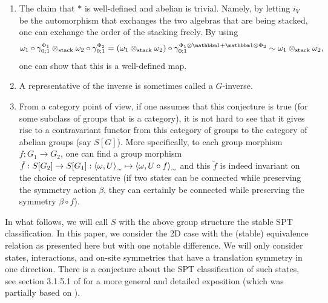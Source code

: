 \documentclass[11pt,a4paper,twoside]{article}
\numberwithin{equation}{section}
\begin{document}
	\begin{enumerate}
		\item The claim that $*$ is well-defined and abelian is trivial. Namely, by letting $i_V$ be the automorphism that exchanges the two algebras that are being stacked, one can exchange the order of the stacking freely. By using
		\begin{equation}
			\omega_1\circ\gamma^{\Phi_1}_{0;1}\otimes_\text{stack}\omega_2\circ\gamma^{\Phi_2}_{0;1}=(\omega_1\otimes_{\text{stack}}\omega_2)\circ\gamma^{\Phi_1\otimes\id+\id\otimes\Phi_2}_{0;1}\sim\omega_1\otimes_{\text{stack}}\omega_2,
		\end{equation}
		one can show that this is a well-defined map.
		\item A representative of the inverse is sometimes called a $G$-inverse.
		\item From a category point of view, if one assumes that this conjecture is true (for some subclass of groups that is a category), it is not hard to see that it gives rise to a contravariant functor from this category of groups to the category of abelian groups (say $S[G]$). More specifically, to each group morphism $f:G_1\rightarrow G_2$, one can find a group morphism $\tilde{f}:S[G_2]\rightarrow S[G_1]:\expval{\omega,U}_\sim\mapsto \expval{\omega,U\circ f}_\sim$ and this $\tilde{f}$ is indeed invariant on the choice of representative (if two states can be connected while preserving the symmetry action $\beta$, they can certainly be connected while preserving the symmetry $\beta\circ f$).
	\end{enumerate}
	In what follows, we will call $S$ with the above group structure the stable SPT classification. In this paper, we consider the 2D case with the (stable) equivalence relation as presented here but with one notable difference. We will only consider states, interactions, and on-site symmetries that have a translation symmetry in one direction. There is a conjecture about the SPT classification of such states, see section 3.1.5.1 of \cite{xiong2019classification} for a more general and detailed exposition (which was partially based on \cite{Chen_2013}).
\end{document}
